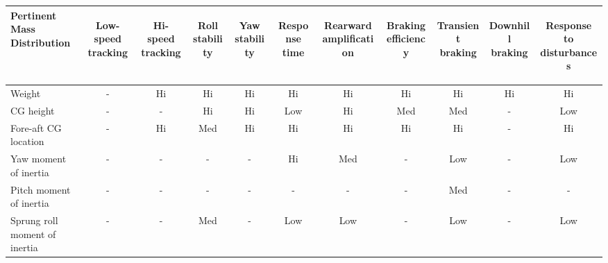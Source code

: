 
\begin{table}[H]
	\centering\footnotesize
	\begin{threeparttable}
	
        \begin{tabulary}{\textwidth}{lcccccccccc}
            \toprule
            \textbf{Pertinent Mass Distribution} & \begin{sideways}\textbf{Low-speed tracking}\end{sideways} & \begin{sideways}\textbf{Hi-speed tracking}\end{sideways} & \begin{sideways}\textbf{Roll stability}\end{sideways} & \begin{sideways}\textbf{Yaw stability}\end{sideways} & \begin{sideways}\textbf{Response time}\end{sideways} & \begin{sideways}\textbf{Rearward amplification}\end{sideways} & \begin{sideways}\textbf{Braking efficiency}\end{sideways} & \begin{sideways}\textbf{Transient braking}\end{sideways} & \begin{sideways}\textbf{Downhill braking}\end{sideways} & \begin{sideways}\textbf{Response to disturbances}\end{sideways} \\\midrule
            Weight & -     & Hi    & Hi    & Hi    & Hi    & Hi    & Hi    & Hi    & Hi    & Hi \\
            CG height & -     & -     & Hi    & Hi    & Low   & Hi    & Med   & Med   & -     & Low \\
            Fore-aft CG location & -     & Hi    & Med   & Hi    & Hi    & Hi    & Hi    & Hi    & -     & Hi \\
            Yaw moment of inertia & -     & -     & -     & -     & Hi    & Med   & -     & Low   & -     & Low \\
            Pitch moment of inertia & -     & -     & -     & -     & -     & -     & -     & Med   & -     & - \\
            Sprung roll moment of inertia & -     & -     & Med   & -     & Low   & Low   & -     & Low   & -     & Low\\
            \bottomrule
		\end{tabulary}


\end{threeparttable}
\end{table}
